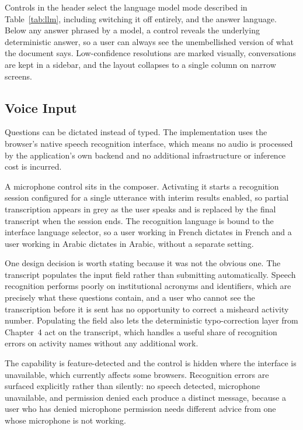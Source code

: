 Controls in the header select the language model mode described in Table~\ref{tab:llm}, including switching it off entirely, and the answer language. Below any answer phrased by a model, a control reveals the underlying deterministic answer, so a user can always see the unembellished version of what the document says. Low-confidence resolutions are marked visually, conversations are kept in a sidebar, and the layout collapses to a single column on narrow screens.

\subsection{Voice Input}

Questions can be dictated instead of typed. The implementation uses the browser's native speech recognition interface, which means no audio is processed by the application's own backend and no additional infrastructure or inference cost is incurred.

A microphone control sits in the composer. Activating it starts a recognition session configured for a single utterance with interim results enabled, so partial transcription appears in grey as the user speaks and is replaced by the final transcript when the session ends. The recognition language is bound to the interface language selector, so a user working in French dictates in French and a user working in Arabic dictates in Arabic, without a separate setting.

One design decision is worth stating because it was not the obvious one. The transcript populates the input field rather than submitting automatically. Speech recognition performs poorly on institutional acronyms and identifiers, which are precisely what these questions contain, and a user who cannot see the transcription before it is sent has no opportunity to correct a misheard activity number. Populating the field also lets the deterministic typo-correction layer from Chapter~4 act on the transcript, which handles a useful share of recognition errors on activity names without any additional work.

The capability is feature-detected and the control is hidden where the interface is unavailable, which currently affects some browsers. Recognition errors are surfaced explicitly rather than silently: no speech detected, microphone unavailable, and permission denied each produce a distinct message, because a user who has denied microphone permission needs different advice from one whose microphone is not working.

